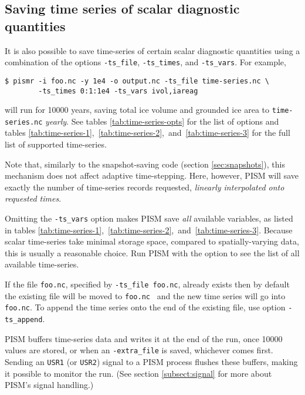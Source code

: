 \subsection{Saving time series of scalar diagnostic quantities}
\label{sec:saving-time-series}

\newcommand{\alltsvars}{\ref{tab:time-series-1},~\ref{tab:time-series-2},~and~\ref{tab:time-series-3}}

 It is also possible to save time-series of certain scalar diagnostic quantities using a combination of the options \texttt{-ts_file}, \texttt{-ts_times}, and \texttt{-ts_vars}.  For example,
\begin{verbatim}
$ pismr -i foo.nc -y 1e4 -o output.nc -ts_file time-series.nc \
        -ts_times 0:1:1e4 -ts_vars ivol,iareag
\end{verbatim}
will run for 10000 years, saving total ice volume and grounded ice area to \texttt{time-series.nc} \emph{yearly}. See tables \ref{tab:time-series-opts} for the list of options and tables \alltsvars{} for the full list of supported time-series.

Note that, similarly to the snapshot-saving code (section \ref{sec:snapshots}), this mechanism does not affect adaptive time-stepping.  Here, however, PISM will save exactly the number of time-series records requested, \emph{linearly interpolated onto requested times}.

Omitting the \texttt{-ts_vars} option makes PISM save \emph{all} available
variables, as listed in tables \alltsvars{}.  Because scalar
time-series take minimal storage space, compared to spatially-varying data,
this is usually a reasonable choice. Run PISM with the
 option to see the list of all available time-series.

If the file \texttt{foo.nc}, specified by \texttt{-ts_file foo.nc}, already exists then by default the existing file will be moved to \texttt{foo.nc~} and the new time series will go into \texttt{foo.nc}.  To append the time series onto the end of the existing file, use option \texttt{-ts_append}.

PISM buffers time-series data and writes it at the end of the run, once 10000
values are stored, or when an \texttt{-extra_file} is saved, whichever comes first. Sending an \texttt{USR1} (or
\texttt{USR2}) signal to a PISM process flushes these buffers, making it
possible to monitor the run. (See section \ref{subsect:signal} for more about
PISM's signal handling.)

